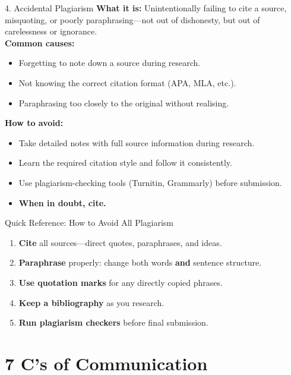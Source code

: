 \documentclass[12pt,a4paper]{article}
\begin{document}
\begin{warnbox}{4. Accidental Plagiarism}
\textbf{What it is:} Unintentionally failing to cite a source, misquoting, or poorly paraphrasing---not out of dishonesty, but out of carelessness or ignorance.\\[0.2cm]
\textbf{Common causes:}
\begin{itemize}[noitemsep]
    \item Forgetting to note down a source during research.
    \item Not knowing the correct citation format (APA, MLA, etc.).
    \item Paraphrasing too closely to the original without realising.
\end{itemize}
\textbf{How to avoid:}
\begin{itemize}[noitemsep]
    \item Take detailed notes with full source information during research.
    \item Learn the required citation style and follow it consistently.
    \item Use plagiarism-checking tools (Turnitin, Grammarly) before submission.
    \item \textbf{When in doubt, cite.}
\end{itemize}
\end{warnbox}

\begin{tipbox}{Quick Reference: How to Avoid All Plagiarism}
\begin{enumerate}[noitemsep]
    \item \textbf{Cite} all sources---direct quotes, paraphrases, and ideas.
    \item \textbf{Paraphrase} properly: change both words \textbf{and} sentence structure.
    \item \textbf{Use quotation marks} for any directly copied phrases.
    \item \textbf{Keep a bibliography} as you research.
    \item \textbf{Run plagiarism checkers} before final submission.
\end{enumerate}
\end{tipbox}

\newpage

\section{7 C's of Communication}
\end{document}
